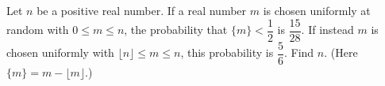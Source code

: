Let $n$ be a positive real number. If a real number $m$ is chosen uniformly at random with $0\le m\le n$, the probability that $\{m\}<\dfrac12$ is $\dfrac{15}{28}$. If instead $m$ is chosen uniformly with $\lfloor n\rfloor\le m\le n$, this probability is $\dfrac56$. Find $n$. (Here $\{m\}=m-\lfloor m\rfloor$.)
